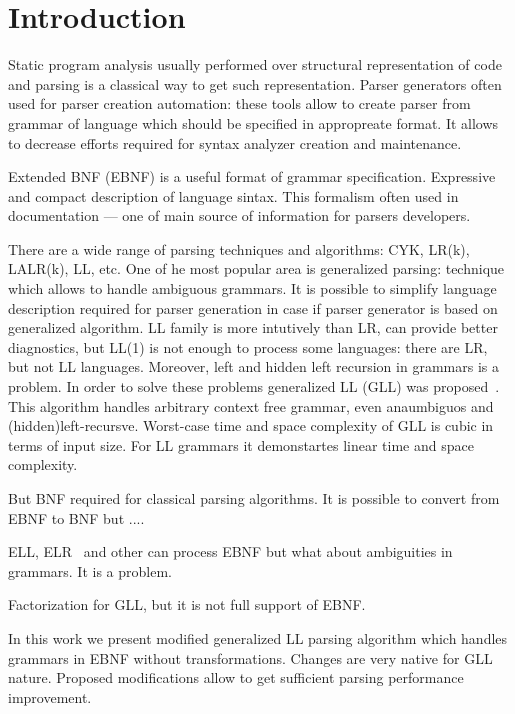 \documentclass[runningheads,a4paper]{llncs}
\begin{document}
\section{Introduction}%

Static program analysis usually performed over structural representation of code and parsing is a classical way to get such representation.
Parser generators often used for parser creation automation: these tools allow to create parser from grammar of language which should be specified in appropreate format.
It allows to decrease efforts required for syntax analyzer creation and maintenance.

Extended BNF (EBNF) is a useful format of grammar specification. 
Expressive and compact description of language sintax. 
This formalism often used in documentation --- one of main source of information for parsers developers.

There are a wide range of parsing techniques and algorithms: CYK, LR(k), LALR(k), LL, etc. 
One of he most popular area is generalized parsing: technique which allows to handle ambiguous grammars. 
It is possible to simplify language description required for parser generation in case if parser generator is based on generalized algorithm.
LL family is more intutively than LR, can provide better diagnostics, but LL(1) is not enough to process some languages: there are LR, but not LL languages.
Moreover, left and hidden left recursion in grammars is a problem. 
In order to solve these problems generalized LL (GLL) was proposed~\cite{!!!}. 
This algorithm handles arbitrary context free grammar, even anaumbiguos and (hidden)left-recursve.
Worst-case time and space complexity of GLL is cubic in terms of input size. 
For LL grammars it demonstartes linear time and space complexity.

But BNF required for classical parsing algorithms.
It is possible to convert from EBNF to BNF but ....

ELL, ELR~\cite{AttributedELL,ELRR,ECFGparsing,ELLParser,ELL,ECFG,ELALR,ELRParsing} and other can process EBNF but what about ambiguities in grammars. It is a problem.

Factorization for GLL, but it is not full support of EBNF.

In this work we present modified generalized LL parsing algorithm which handles grammars in EBNF without transformations.
Changes are very native for GLL nature.
Proposed modifications allow to get sufficient parsing performance improvement.
\end{document}
